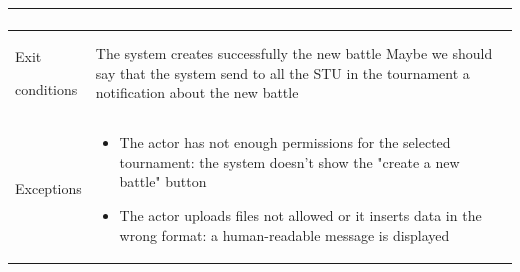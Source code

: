 \begin{center}
\begin{tabular}{| m{2cm} | m{10cm}|}
\begin{enumerate}
                                \end{enumerate}                                                                           \\ \hline
        Exit \par conditions  & The system creates successfully the new battle    {\color{red} Maybe we should say that the system send to all the STU in the tournament a notification about the new battle} \\ \hline
        Exceptions            & \begin{itemize}
                                    \item The actor has not enough permissions for the selected tournament: the system doesn't show the "create a new battle" button
                                    \item The actor uploads files not allowed or it inserts data in the wrong format: a human-readable message is displayed
                                \end{itemize}                                               \\ \hline
    \end{tabular}
\end{center}

